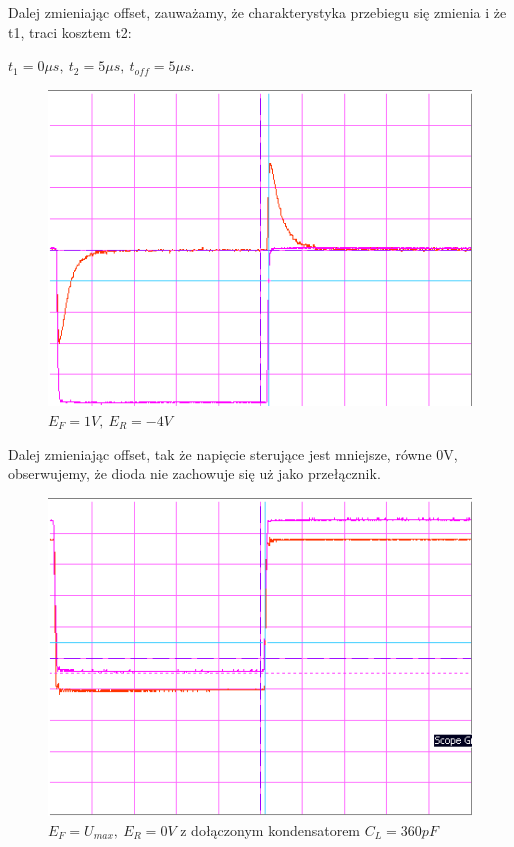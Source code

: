 \documentclass[a4paper,11pt]{article}
\begin{document}
Dalej zmieniając offset, zauważamy, że charakterystyka przebiegu się zmienia i że t1, traci kosztem t2:

 \(t_1 = 0 \mu s,\ t_2 = 5 \mu s,\ t_{off} = 5 \mu s \).

\begin{figure} [H]
  \begin{center}
    \includegraphics{../Obrazki_i_tekst/obrobione/1dsciety.png}
    \caption{\( E_F = 1V, \ E_R = -4 V\)}
  \end{center}
\end{figure}

Dalej zmieniając offset, tak że napięcie sterujące jest mniejsze, równe 0V, obserwujemy, że dioda nie zachowuje się uż jako przełącznik.

\begin{figure} [H]
  \begin{center}
    \includegraphics{../Obrazki_i_tekst/obrobione/1esciety.png}
    \caption{\( E_F = U_{max}, \ E_R = 0V \) z dołączonym kondensatorem \(C_L = 360 pF\)}
  \end{center}
\end{figure}
\end{document}
